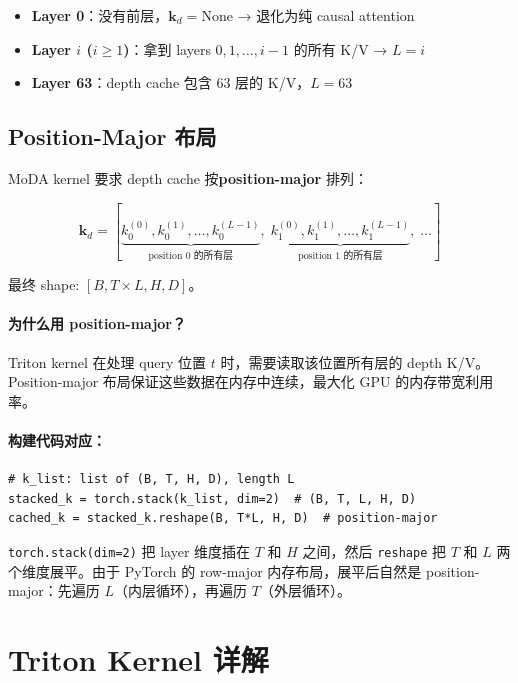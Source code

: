 \documentclass[11pt,a4paper]{article}
\begin{document}
\begin{itemize}
  \item \textbf{Layer 0}：没有前层，$\mathbf{k}_d = \text{None}$ → 退化为纯 causal attention
  \item \textbf{Layer $i$ ($i \geq 1$)}：拿到 layers $0, 1, \ldots, i-1$ 的所有 K/V → $L = i$
  \item \textbf{Layer 63}：depth cache 包含 63 层的 K/V，$L = 63$
\end{itemize}

\subsection{Position-Major 布局}

MoDA kernel 要求 depth cache 按\textbf{position-major} 排列：

\begin{equation}
  \mathbf{k}_d = [\underbrace{k_0^{(0)}, k_0^{(1)}, \ldots, k_0^{(L-1)}}_{\text{position 0 的所有层}},\; \underbrace{k_1^{(0)}, k_1^{(1)}, \ldots, k_1^{(L-1)}}_{\text{position 1 的所有层}},\; \ldots]
\end{equation}

最终 shape: $[B, T \times L, H, D]$。

\paragraph{为什么用 position-major？} Triton kernel 在处理 query 位置 $t$ 时，需要读取该位置所有层的 depth K/V。Position-major 布局保证这些数据在内存中连续，最大化 GPU 的内存带宽利用率。

\paragraph{构建代码对应：}
\begin{lstlisting}
# k_list: list of (B, T, H, D), length L
stacked_k = torch.stack(k_list, dim=2)  # (B, T, L, H, D)
cached_k = stacked_k.reshape(B, T*L, H, D)  # position-major
\end{lstlisting}

\texttt{torch.stack(dim=2)} 把 layer 维度插在 $T$ 和 $H$ 之间，然后 \texttt{reshape} 把 $T$ 和 $L$ 两个维度展平。由于 PyTorch 的 row-major 内存布局，展平后自然是 position-major：先遍历 $L$（内层循环），再遍历 $T$（外层循环）。

\section{Triton Kernel 详解}
\end{document}
